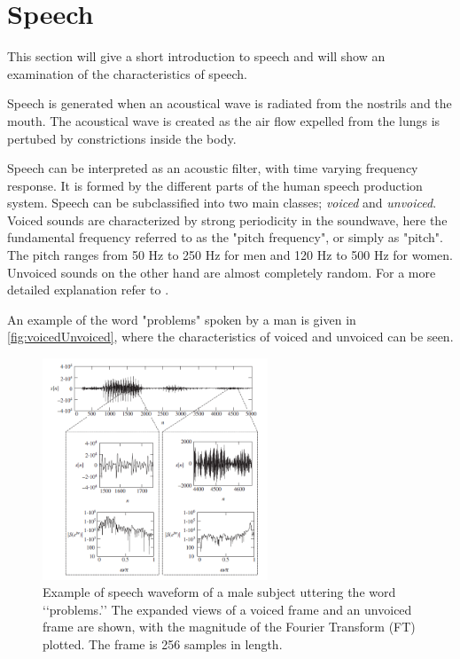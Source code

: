 \section{Speech} \label{sec:Speech}
This section will give a short introduction to speech and will show an examination of the characteristics of speech.

Speech is generated when an acoustical wave is radiated from the nostrils and the mouth. The acoustical wave is created as the air flow expelled from the lungs is pertubed by constrictions inside the body. 

Speech can be interpreted as an acoustic filter, with time varying frequency response. It is formed by the different parts of the human speech production system. Speech can be subclassified into two main classes; \textit{voiced} and \textit{unvoiced}. Voiced sounds are characterized by strong periodicity in the soundwave, here the fundamental frequency referred  to as the "pitch frequency", or simply as "pitch". The pitch ranges from 50 Hz to 250 Hz for men and 120 Hz to 500 Hz for women. Unvoiced sounds on the other hand are almost completely random. For a more detailed explanation refer to \citep{Speech}. 

An example of the word "problems" spoken by a man is given in \autoref{fig:voicedUnvoiced}, where the characteristics of voiced and unvoiced can be seen. 

\begin{figure}[H]
	\centering
	\includegraphics[width=0.6\textwidth]{figures/Speech/VoicedvsUnvoiced}
	\caption{Example of speech waveform of a male subject uttering the word ‘‘problems.’’ The expanded views of a voiced frame and an unvoiced frame are shown, with the magnitude of the Fourier Transform (FT) plotted. The frame is 256 samples in length.}
	\label{fig:voicedUnvoiced}
\end{figure}   

